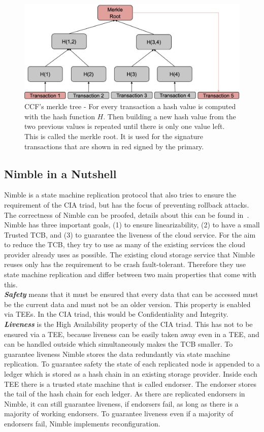 \begin{figure}[t]
	\includegraphics[scale=0.17]{pictures/merkle_new}
	\caption{CCF's merkle tree - For every transaction a hash value is computed with the hash function $H$. Then building a new hash value from the two previous values is repeated until there is only one value left. This is called the merkle root. It is used for the signature transactions that are shown in red signed by the primary.}
	\label{merkle}
\end{figure}



\subsection{Nimble in a Nutshell}
Nimble is a state machine replication protocol that also tries to ensure the requirement of the CIA triad, but has the focus of preventing rollback attacks. The correctness of Nimble can be proofed, details about this can be found in~\cite{Nimble}.\\
Nimble has three important goals, (1) to ensure linearizability, (2) to have a small Trusted TCB, and (3) to guarantee the liveness of the cloud service. For the aim to reduce the TCB, they try to use as many of the existing services the cloud provider already uses as possible. The existing cloud storage service that Nimble reuses only has the requirement to be crash fault-tolerant. Therefore they use state machine replication and differ between two main properties that come with this.\\
	\textbf{\textit{Safety}} means that it must be ensured that every data that can be accessed must be the current data and must not be an older version. This property is enabled via TEEs. In the CIA triad, this would be Confidentiality and Integrity.\\
	\textbf{\textit{Liveness}} is the High Availability property of the CIA triad. This has not to be ensured via a TEE, because liveness can be easily taken away even in a TEE, and can be handled outside which simultaneously makes the TCB smaller.
	To guarantee liveness Nimble stores the data redundantly via state machine replication. To guarantee safety the state of each replicated node is appended to a ledger which is stored as a hash chain in an existing storage provider. Inside each TEE there is a trusted state machine that is called endorser. The endorser stores the tail of the hash chain for each ledger. As there are replicated endorsers in Nimble, it can still guarantee liveness, if endorsers fail, as long as there is a majority of working endorsers. To guarantee liveness even if a majority of endorsers fail, Nimble implements reconfiguration. 
